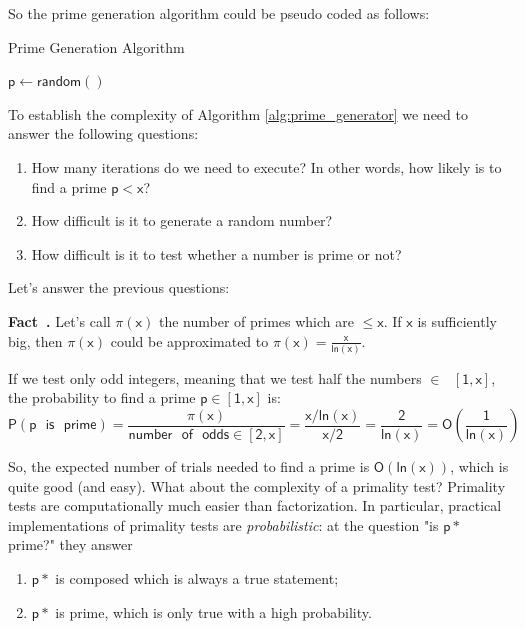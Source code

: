 \documentclass{article}
\newcounter{fact}[section]
\newenvironment{fact}[1][]{\refstepcounter{fact}\par\medskip
   \noindent \textbf{Fact~\thefact. #1} \rmfamily}{\medskip}
\begin{document}
\par \noindent So the prime generation algorithm could be pseudo coded as follows:

\begin{algorithm}
    \caption{Prime Generation Algorithm}
    \label{alg:prime_generator}
    \begin{algorithmic}
        \Repeat
            \State $\mathsf{p \gets random()}$
    \end{algorithmic}
\end{algorithm}

\par \noindent To establish the complexity of Algorithm \ref{alg:prime_generator} we need to answer the following questions:
\begin{enumerate}
    \item How many iterations do we need to execute? In other words, how likely is to find a prime $\mathsf{p < x}$?
    \item How difficult is it to generate a random number?
    \item How difficult is it to test whether a number is prime or not?
\end{enumerate}

\par \noindent Let's answer the previous questions:

\begin{fact}
    Let's call $\mathsf{\pi(x)}$ the number of primes which are $\mathsf{\leq x}$. If $\mathsf{x}$ is sufficiently big, then $\mathsf{\pi(x)}$ could be approximated to $\mathsf{\pi(x) = \frac{x}{ln(x)}}$.
\end{fact}

\par \noindent If we test only odd integers, meaning that we test half the numbers $\mathsf{\in \text{ } [1, x]}$, the probability to find a prime $\mathsf{p \in [1, x]}$ is:
$$
    \mathsf{P(p \text{ } is \text{ } prime) = \frac{\pi(x)}{number \text{ } of \text{ } odds \in [2,x]} = \frac{x/ln(x)}{x/2} = \frac{2}{ln(x)} = O \left( \frac{1}{ln(x)} \right)}
$$

\par \noindent So, the expected number of trials needed to find a prime is $\mathsf{O(ln(x))}$, which is quite good (and easy). What about the complexity of a primality test? Primality tests are computationally much easier than factorization. In particular, practical implementations of primality tests are \textit{probabilistic}: at the question "is $\mathsf{p*}$ prime?" they answer
\begin{enumerate}
    \item $\mathsf{p*}$ is composed which is always a true statement;
    \item $\mathsf{p*}$ is prime, which is only true with a high probability.
\end{enumerate}
\end{document}

